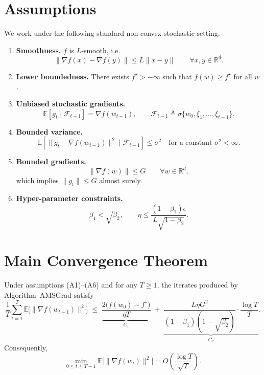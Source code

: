 \documentclass[11pt]{article}
\newcommand{\E}{\mathbb{E}}
\newcommand{\R}{\mathbb{R}}
\begin{document}
\newpage
\section*{Assumptions}
We work under the following standard non‑convex stochastic setting.

\begin{enumerate}[label=(A\arabic*)]
\item \textbf{Smoothness.} $f$ is $L$‑smooth, i.e.
\[
\|\nabla f(x)-\nabla f(y)\|\le L\|x-y\|\qquad\forall x,y\in\R^{d}. \tag{A1}
\]

\item \textbf{Lower boundedness.} There exists $f^{\star}>-\infty$ such that
$f(w)\ge f^{\star}$ for all $w$. 

\item \textbf{Unbiased stochastic gradients.}
\[
\E\!\left[g_{t}\mid\mathcal{F}_{t-1}\right]=\nabla f(w_{t-1}),\qquad
\mathcal{F}_{t-1}\triangleq\sigma\{w_{0},\xi_{1},\dots,\xi_{t-1}\}. \tag{A3}
\]

\item \textbf{Bounded variance.}
\[
\E\!\left[\|g_{t}-\nabla f(w_{t-1})\|^{2}\mid\mathcal{F}_{t-1}\right]\le\sigma^{2}
\quad\text{for a constant }\sigma^{2}<\infty. \tag{A4}
\]

\item \textbf{Bounded gradients.}
\[
\| \nabla f(w)\|\le G\qquad\forall w\in\R^{d},\tag{A5}
\]
which implies $\|g_{t}\|\le G$ almost surely.

\item \textbf{Hyper‑parameter constraints.}
\[
\beta_{1}<\sqrt{\beta_{2}},\qquad
\eta\le \frac{(1-\beta_{1})\epsilon}{L\sqrt{1-\beta_{2}}}. \tag{A6}
\]
\end{enumerate}

\section*{Main Convergence Theorem}
\begin{theorem}\label{thm:amsgrad}
Under assumptions (A1)–(A6) and for any $T\ge 1$, the iterates produced by
Algorithm~AMSGrad satisfy
\[
\frac{1}{T}\sum_{t=1}^{T}\E\!\bigl[\|\nabla f(w_{t-1})\|^{2}\bigr]
\;\le\;
\underbrace{\frac{2\bigl(f(w_{0})-f^{\star}\bigr)}{\eta T}}_{C_{1}}
\;+\;
\underbrace{\frac{L\eta G^{2}}{(1-\beta_{1})(1-\sqrt{\beta_{2}})}\cdot\frac{\log T}{T}}_{C_{2}}.
\]
Consequently,
\[
\min_{0\le t\le T-1}\E\!\bigl[\|\nabla f(w_{t})\|^{2}\bigr]=O\!\left(\frac{\log T}{\sqrt{T}}\right).
\]
\end{theorem}
\end{document}
